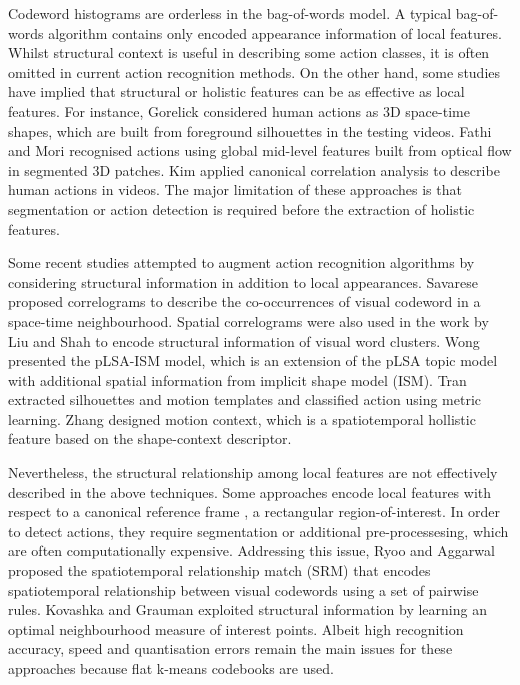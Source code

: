 Codeword histograms are orderless in the bag-of-words model. 
A typical bag-of-words algorithm contains only encoded appearance information of local features.  
Whilst structural context is useful in describing some action classes, it is often omitted in current action recognition methods.
On the other hand, some studies have implied that structural or holistic features can be as effective as local features. 
For instance, Gorelick \etal \cite{Gorelick2007} considered human actions as 3D space-time shapes, which are built from foreground silhouettes in the testing videos. Fathi and Mori \cite{Fathi2008} recognised actions using global mid-level features built from optical flow in segmented 3D patches. Kim \etal \cite{Kim2007} applied canonical correlation analysis to describe human actions in videos. The major limitation of these approaches is that segmentation or action detection is required before the extraction of holistic features.  

Some recent studies attempted to augment action recognition algorithms by considering structural information in addition to local appearances. 
Savarese \etal \cite{Savarese2008} proposed correlograms to describe the co-occurrences of visual codeword in a space-time neighbourhood. Spatial correlograms were also used in the work by Liu and Shah \cite{Liu2008} to encode structural information of visual word clusters.  
Wong \etal \cite{Wong2007} presented the pLSA-ISM model, which is an extension of the pLSA topic model \cite{Fergus2005} with additional spatial information from implicit shape model (ISM). 
Tran \etal \cite{Tran2008} extracted silhouettes and motion templates and classified action using metric learning.  
Zhang \etal \cite{Zhang2008} designed motion context, which is a spatiotemporal hollistic feature based on the shape-context descriptor.  

Nevertheless, the structural relationship among local features are not effectively described in the above techniques. 
Some approaches encode local features with respect to a canonical reference frame \cite{Wong2007, Tran2008, Zhang2008}, \eg a rectangular region-of-interest. In order to detect actions, they require segmentation or additional pre-processesing, which are often computationally expensive.
Addressing this issue, Ryoo and Aggarwal \cite{Ryoo2009} proposed the spatiotemporal relationship match (SRM) that encodes spatiotemporal relationship between visual codewords using a set of pairwise rules. Kovashka and Grauman \cite{Kovashka2010} exploited structural information by learning an optimal neighbourhood measure of interest points. 
Albeit high recognition accuracy, speed and quantisation errors remain the main issues for these approaches because flat k-means codebooks are used.   


